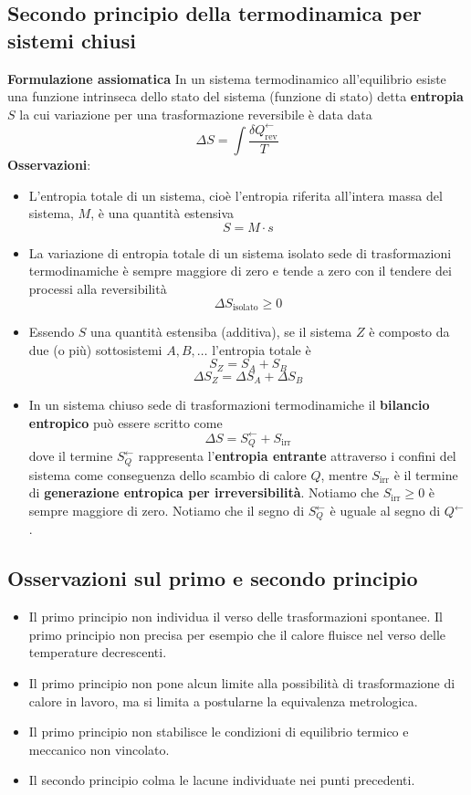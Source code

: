 \subsection{Secondo principio della termodinamica per sistemi chiusi}
\textbf{Formulazione assiomatica}\newline
In un sistema termodinamico all’equilibrio esiste una funzione intrinseca dello stato del sistema (funzione di stato) detta \textbf{entropia} $S$ la cui variazione per una trasformazione reversibile è data data
\[
    \Delta S = \int \frac{\delta Q_{\text{rev}}^\leftarrow }{T}
\]
\textbf{Osservazioni}:
\begin{itemize}
    \item L’entropia totale di un sistema, cioè l’entropia riferita all’intera massa del sistema, $M$, è una quantità estensiva
    \[
        S = M \cdot s
    \]
    \item La variazione di entropia totale di un sistema isolato sede di trasformazioni termodinamiche è sempre maggiore di zero e tende a zero con il tendere dei processi alla reversibilità
    \[
        \Delta S_{\text{isolato}} \geq 0
    \]
    \item Essendo $S$ una quantità estensiba (additiva), se il sistema $Z$ è composto da due (o più) sottosistemi $A, B, \dots$ l'entropia totale è
    \[
        S_Z = S_A + S_B
    \]
    \[
        \Delta S_Z = \Delta S_A + \Delta S_B
    \]
    \item In un sistema chiuso sede di trasformazioni termodinamiche il \textbf{bilancio entropico} può essere scritto come
    \[
        \Delta S = S_Q^\leftarrow + S_{\text{irr}}
    \]
    dove il termine $S_Q^\leftarrow$ rappresenta l'\textbf{entropia entrante} attraverso i confini del sistema come conseguenza dello scambio di calore $Q$, mentre $S_{\text{irr}}$ è il termine di \textbf{generazione entropica per irreversibilità}.\newline
    \newline
    Notiamo che $S_{\text{irr}} \geq 0$ è sempre maggiore di zero.\newline
    Notiamo che il segno di $S_Q^\leftarrow$ è uguale al segno di $Q^\leftarrow $.
\end{itemize}
\subsection{Osservazioni sul primo e secondo principio}
\begin{itemize}
    \item Il primo principio non individua il verso delle trasformazioni spontanee. Il primo principio non precisa per esempio che il calore fluisce nel verso delle temperature decrescenti.
    \item Il primo principio non pone alcun limite alla possibilità di trasformazione di calore in lavoro, ma
    si limita a postularne la equivalenza metrologica.
    \item Il primo principio non stabilisce le condizioni di equilibrio termico e meccanico non vincolato.
    \item Il secondo principio colma le lacune individuate nei punti precedenti.
\end{itemize}